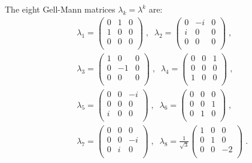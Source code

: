 \documentclass[final,5p,times,twocolumn]{elsarticle}
\begin{document}
The eight Gell-Mann matrices $\lambda_k = \lambda^k$ are:
\begin{eqnarray*}
 &&
 \lambda_1
 =
 \left(\begin{array}{ccc}
  0 & 1 & 0 \\
  1 & 0 & 0 \\
  0 & 0 & 0 \\
 \end{array}\right)
 \;, \;\;
 \lambda_2
 =
 \left(\begin{array}{ccc}
  0 & -i & 0 \\
  i &  0 & 0 \\
  0 &  0 & 0 \\
 \end{array}\right)
 \;, \\
 &&
 \lambda_3
 =
 \left(\begin{array}{ccc}
  1 &  0 & 0 \\
  0 & -1 & 0 \\
  0 &  0 & 0 \\
 \end{array}\right)
 \;, \;\;
 \lambda_4
 =
 \left(\begin{array}{ccc}
  0 & 0 & 1 \\
  0 & 0 & 0 \\
  1 & 0 & 0 \\
 \end{array}\right)
 \;, \\
 &&
 \lambda_5
 =
 \left(\begin{array}{ccc}
  0 & 0 & -i \\
  0 & 0 &  0 \\
  i & 0 &  0 \\
 \end{array}\right)
 \;, \;\;
 \lambda_6
 =
 \left(\begin{array}{ccc}
  0 & 0 & 0 \\
  0 & 0 & 1 \\
  0 & 1 & 0 \\
 \end{array}\right)
 \;, \\
 &&
 \lambda_7
 =
 \left(\begin{array}{ccc}
  0 & 0 &  0 \\
  0 & 0 & -i \\
  0 & i &  0 \\
 \end{array}\right)
 \;, \;\;
 \lambda_8
 =
 \frac{1}{\sqrt{3}}
 \left(\begin{array}{ccc}
  1 & 0 &  0 \\
  0 & 1 &  0 \\
  0 & 0 & -2 \\
 \end{array}\right)
 \;.
\end{eqnarray*}
\end{document}
